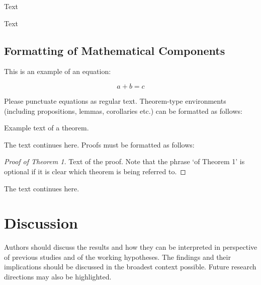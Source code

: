 \documentclass[sensors,article,submit,moreauthors]{Definitions/mdpi}
\begin{document}
Text

Text



\subsection{Formatting of Mathematical Components}

This is an example of an equation:

\begin{equation}
a + b = c
\end{equation}

Please punctuate equations as regular text. Theorem-type environments (including propositions, lemmas, corollaries etc.) can be formatted as follows:
\begin{Theorem}
Example text of a theorem.
\end{Theorem}

The text continues here. Proofs must be formatted as follows:

\begin{proof}[Proof of Theorem 1]
Text of the proof. Note that the phrase `of Theorem 1' is optional if it is clear which theorem is being referred to.
\end{proof}
The text continues here.

\section{Discussion}

Authors should discuss the results and how they can be interpreted in perspective of previous studies and of the working hypotheses. The findings and their implications should be discussed in the broadest context possible. Future research directions may also be highlighted.
\end{document}
